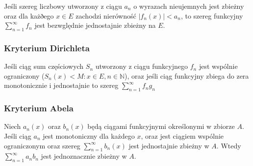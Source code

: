 \documentclass{../notatki}
\begin{document}
Jeśli szereg liczbowy utworzony z ciągu $a_n$ o wyrazach nieujemnych jest
zbieżny oraz dla każðego $x \in E$ zachodzi nierówność $|f_n(x)| < a_n$, to
szereg funkcyjny $\sum_{n=1}^\infty f_n$ jest bezwględnie jednostajnie
zbieżny na $E$.

\subsubsection{Kryterium Dirichleta}

Jeśli ciąg sum częściowych $S_n$ utworzony z ciągu funkcyjnego $f_n$ jest
wspólnie ograniczony ($S_n(x) < M : x \in E, n \in \mathbb{N}$), oraz jeśli
ciąg funkcyjny zbiega do zera monotonicznie i jednostajnie to szereg
$\sum_{n=1}^\infty f_n g_n$

\subsubsection{Kryterium Abela}

Niech $a_n(x)$ oraz $b_n(x)$ będą ciągami funkcyjnymi określonymi w zbiorze
$A$. Jeśli ciąg $a_n$ jest monotoniczny dla każdego $x$, oraz jest
ciągiem wspólnie ograniczonym oraz szereg $\sum_{n=1}^\infty b_n(x)$
jest jednostajnie zbieżny w $A$. Wtedy $\sum_{n=1}^{\infty} a_n b_n$ jest
jednoznacznie zbieżny w $A$.
\end{document}
